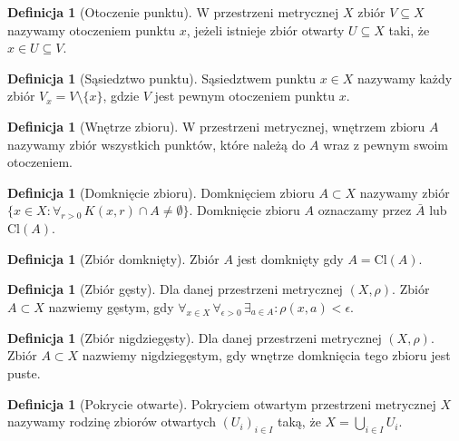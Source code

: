 \documentclass[licencjacka]{pwr_wmat_praca_dyplomowa}
\theoremstyle{plain}
\numberwithin{theorem}{chapter}
\theoremstyle{definition}
\numberwithin{theorem}{chapter}
\newtheorem{definition}[theorem]{Definicja}
\begin{document}
\begin{definition}[Otoczenie punktu]
W przestrzeni metrycznej $X$ zbiór $V \subseteq X$ nazywamy otoczeniem punktu $x$, jeżeli istnieje zbiór otwarty $U \subseteq X$ taki, że $x \in U \subseteq V$.
\end{definition}


\begin{definition}[Sąsiedztwo punktu]
Sąsiedztwem punktu $x \in X$ nazywamy każdy zbiór $V_x = V \setminus \{x\}$, gdzie $V$ jest pewnym otoczeniem punktu $x$.
\end{definition}


\begin{definition}[Wnętrze zbioru]
W przestrzeni metrycznej, wnętrzem zbioru $A$ nazywamy zbiór wszystkich punktów, które należą do $A$ wraz z pewnym swoim otoczeniem.
\end{definition}

\begin{definition}[Domknięcie zbioru]
Domknięciem zbioru $A \subset X$ nazywamy zbiór $\{x \in X: \forall_{r>0} \, K(x, r) \cap A \neq \emptyset\}$. Domknięcie zbioru $A$ oznaczamy przez $\bar{A}$ lub $\textrm{Cl}(A)$.
\end{definition}

\begin{definition}[Zbiór domknięty]
Zbiór $A$ jest domknięty gdy $A = \textrm{Cl}(A)$.
\end{definition}





\begin{definition}[Zbiór gęsty]
Dla danej przestrzeni metrycznej $(X, \rho)$. Zbiór $A \subset X$ nazwiemy gęstym, gdy $\forall_{x \in X} \, \forall_{\epsilon>0} \, \exists_{a \in A} : \rho(x, a) < \epsilon$.
\end{definition}

\begin{definition}[Zbiór nigdziegęsty]
Dla danej przestrzeni metrycznej $(X, \rho)$. Zbiór $A \subset X$ nazwiemy nigdziegęstym, gdy wnętrze domknięcia tego zbioru jest puste.
\end{definition}

\begin{definition}[Pokrycie otwarte]
\cite[s.~195]{ruette2017chaos}
Pokryciem otwartym przestrzeni metrycznej $X$ nazywamy rodzinę zbiorów otwartych $(U_i)_{i \in I}$ taką, że $X=\bigcup_{i \in I}U_i$.
\end{definition}
\end{document}
